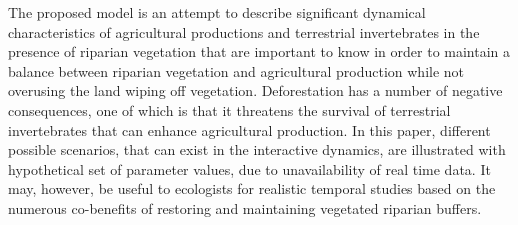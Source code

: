 \documentclass[12pt]{article}
\numberwithin{equation}{section}
\begin{document}
The proposed model is an attempt to describe significant dynamical characteristics of agricultural productions and terrestrial invertebrates in the presence of riparian vegetation that are important to know in order to maintain a balance between riparian vegetation and agricultural production while not overusing the land wiping off vegetation. Deforestation has a number of negative consequences, one of which is that it threatens the survival of terrestrial invertebrates that can enhance agricultural production. In this paper, different possible scenarios, that can exist in the interactive dynamics, are illustrated with hypothetical set of parameter values, due to unavailability of real time data. It may, however, be useful to ecologists for realistic temporal studies based on the numerous co-benefits of restoring and maintaining vegetated riparian buffers.
\end{document}
